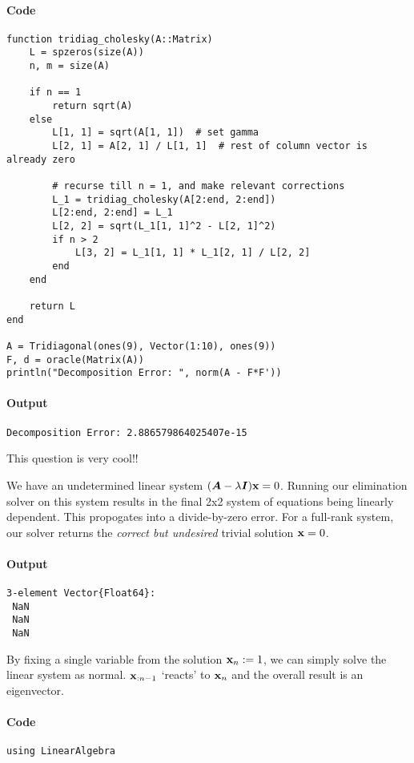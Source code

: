 \documentclass[]{exam}
\let\oldparagraph\paragraph
\renewcommand{\paragraph}[1]{\oldparagraph{#1}\mbox{}}
\begin{document}
\begin{questions}
\begin{enumerate}[label=\arabic*.]
		\paragraph{Code}
		\begin{lstlisting}
function tridiag_cholesky(A::Matrix)
	L = spzeros(size(A))
	n, m = size(A)

	if n == 1
		return sqrt(A)
	else
		L[1, 1] = sqrt(A[1, 1])  # set gamma
		L[2, 1] = A[2, 1] / L[1, 1]  # rest of column vector is already zero

		# recurse till n = 1, and make relevant corrections
		L_1 = tridiag_cholesky(A[2:end, 2:end])
		L[2:end, 2:end] = L_1
		L[2, 2] = sqrt(L_1[1, 1]^2 - L[2, 1]^2)
		if n > 2
			L[3, 2] = L_1[1, 1] * L_1[2, 1] / L[2, 2]
		end
	end

	return L
end

A = Tridiagonal(ones(9), Vector(1:10), ones(9))
F, d = oracle(Matrix(A))
println("Decomposition Error: ", norm(A - F*F'))
		\end{lstlisting}
		\paragraph{Output}
		\begin{lstlisting}
Decomposition Error: 2.886579864025407e-15
		\end{lstlisting}
		This question is very cool!!
\end{enumerate}

\newpage
\question
\hfill

We have an undetermined linear system $(\boldsymbol{A} - \lambda \boldsymbol{I})\boldsymbol{\mathrm{x}} = 0$. Running our elimination solver on this system results in the final 2x2 system of equations being linearly dependent. This propogates into a divide-by-zero error. For a full-rank system, our solver returns the {\it correct but undesired} trivial solution $\boldsymbol{\mathrm{x}} = 0$.

\paragraph{Output}
\begin{lstlisting}
3-element Vector{Float64}:
 NaN
 NaN
 NaN
\end{lstlisting}

By fixing a single variable from the solution $\boldsymbol{\mathrm{x}}_n := 1$, we can simply solve the linear system as normal. $\boldsymbol{\mathrm{x}}_{:n-1}$ `reacts' to $\boldsymbol{\mathrm{x}}_n$ and the overall result is an eigenvector.

\paragraph{Code}
\begin{lstlisting}
using LinearAlgebra


\end{lstlisting}
\end{questions}
\end{document}
